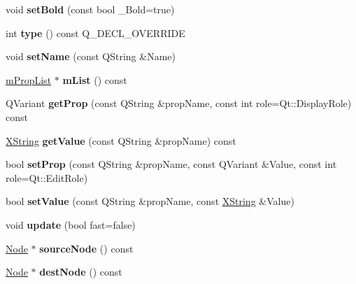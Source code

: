 \begin{DoxyCompactItemize}
void {\bfseries set\+Bold} (const bool \+\_\+\+Bold=true)
\item 
\mbox{\label{class_edge_ad0859f7b8f96e4ab40edb267743b1c08}} 
int {\bfseries type} () const Q\+\_\+\+D\+E\+C\+L\+\_\+\+O\+V\+E\+R\+R\+I\+DE
\item 
\mbox{\label{class_edge_a5e98368ed40bd451f916546cbbe2a0a7}} 
void {\bfseries set\+Name} (const Q\+String \&Name)
\item 
\mbox{\label{class_edge_ac06b4f61493c00b306a69f56695cd805}} 
\hyperlink{classm_prop_list}{m\+Prop\+List} $\ast$ {\bfseries m\+List} () const
\item 
\mbox{\label{class_edge_a5ab5a75449b8a11b219505f2b262b10e}} 
Q\+Variant {\bfseries get\+Prop} (const Q\+String \&prop\+Name, const int role=Qt\+::\+Display\+Role) const
\item 
\mbox{\label{class_edge_a8686eed764b4d152b88ffd3bfad4c0e4}} 
\hyperlink{class_x_string}{X\+String} {\bfseries get\+Value} (const Q\+String \&prop\+Name) const
\item 
\mbox{\label{class_edge_af6dc93404793868d499ec718291dc49f}} 
bool {\bfseries set\+Prop} (const Q\+String \&prop\+Name, const Q\+Variant \&Value, const int role=Qt\+::\+Edit\+Role)
\item 
\mbox{\label{class_edge_aba1c352f2e6c946fa558b8bb3ec8c6ec}} 
bool {\bfseries set\+Value} (const Q\+String \&prop\+Name, const \hyperlink{class_x_string}{X\+String} \&Value)
\item 
\mbox{\label{class_edge_ac939ea67ea9e52a2131ed41cd8d53241}} 
void {\bfseries update} (bool fast=false)
\item 
\mbox{\label{class_edge_aa620dd494d9ad75a10e2800407478097}} 
\hyperlink{class_node}{Node} $\ast$ {\bfseries source\+Node} () const
\item 
\mbox{\label{class_edge_a3c9de73a06f270ffc6d3a6ff2ba5d4c6}} 
\hyperlink{class_node}{Node} $\ast$ {\bfseries dest\+Node} () const
\item 
\mbox{\label{class_edge_a59940256d01fb5327bf5ba20d9403080}} 

\end{DoxyCompactItemize}
